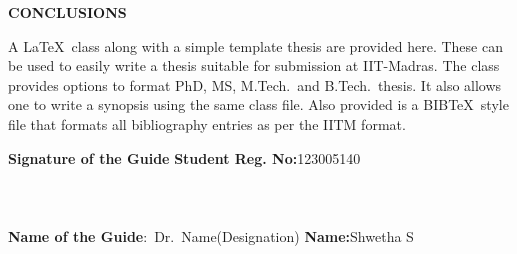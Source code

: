 	
	\begin{center}
		\Large{{\textbf{CONCLUSIONS}}}
	\end{center}
	
		\noindent A \LaTeX\ class along with a simple template thesis are provided here.  These can be used to easily write a thesis suitable for submission at IIT-Madras.  The class provides options to format PhD, MS, M.Tech.\ and B.Tech.\ thesis.  It also allows one to write a synopsis using the same class file.  Also provided is a BIB\TeX\ style file that formats all bibliography entries as per the IITM format.
	
	\vspace*{24pt}
	
		\noindent \textbf{Signature of the Guide} \hspace*{70mm} \textbf{Student Reg. No:}123005140\\
			\\
		\\
		\\
	\noindent \textbf{Name of the Guide}:~Dr.~Name(Designation) \hspace*{35mm} \textbf{Name:}Shwetha S
	\pagebreak
	\pagebreak
	
	

